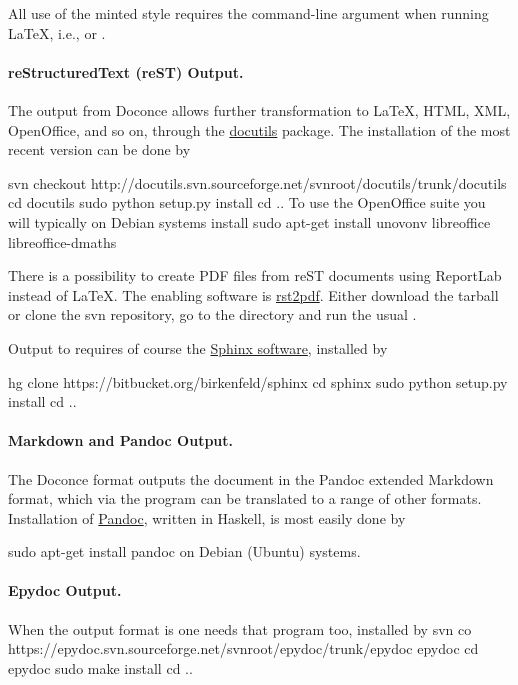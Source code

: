 \documentclass[%
oneside,                 %
final,                   %
chapterprefix=true,      %
open=right               %
10pt]{book}
\begin{document}
All
use of the minted style requires the  command-line
argument when running {\LaTeX}, i.e.,  or .


\paragraph{reStructuredText (reST) Output.}
The  output from Doconce allows further transformation to {\LaTeX},
HTML, XML, OpenOffice, and so on, through the \href{{http://docutils.sourceforge.net}}{docutils} package.  The installation of the
most recent version can be done by

\bsys
svn checkout http://docutils.svn.sourceforge.net/svnroot/docutils/trunk/docutils
cd docutils
sudo python setup.py install
cd ..
\esys
To use the OpenOffice suite you will typically on Debian systems install
\bsys
sudo apt-get install unovonv libreoffice libreoffice-dmaths
\esys

There is a possibility to create PDF files from reST documents
using ReportLab instead of {\LaTeX}. The enabling software is
\href{{http://code.google.com/p/rst2pdf}}{rst2pdf}. Either download the tarball
or clone the svn repository, go to the  directory and
run the usual .


Output to  requires of course the
\href{{http://sphinx.pocoo.org}}{Sphinx software},
installed by

\bsys
hg clone https://bitbucket.org/birkenfeld/sphinx
cd sphinx
sudo python setup.py install
cd ..
\esys

\paragraph{Markdown and Pandoc Output.}
The Doconce format  outputs the document in the Pandoc
extended Markdown format, which via the  program can be
translated to a range of other formats. Installation of \href{{http://johnmacfarlane.net/pandoc/}}{Pandoc}, written in Haskell, is most
easily done by

\bsys
sudo apt-get install pandoc
\esys
on Debian (Ubuntu) systems.

\paragraph{Epydoc Output.}
When the output format is  one needs that program too, installed
by
\bsys
svn co https://epydoc.svn.sourceforge.net/svnroot/epydoc/trunk/epydoc epydoc
cd epydoc
sudo make install
cd ..
\esys
\end{document}

